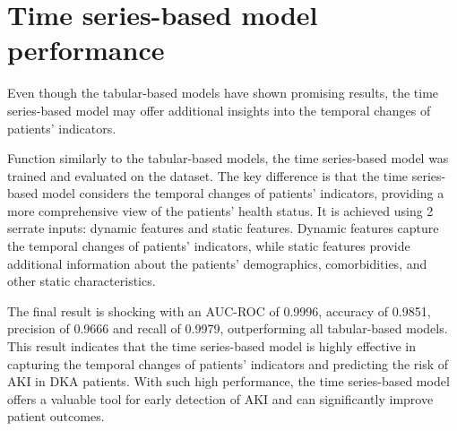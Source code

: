 \documentclass[../main.tex]{subfiles}
\begin{document}
\section{Time series-based model performance}

Even though the tabular-based models have shown promising results, the time series-based model may offer additional insights into the temporal changes of patients' indicators.

Function similarly to the tabular-based models, the time series-based model was trained and evaluated on the dataset.
The key difference is that the time series-based model considers the temporal changes of patients' indicators, providing a more comprehensive view of the patients' health status.
It is achieved using 2 serrate inputs: dynamic features and static features.
Dynamic features capture the temporal changes of patients' indicators, while static features provide additional information about the patients' demographics, comorbidities, and other static characteristics.

The final result is shocking with an AUC-ROC of 0.9996, accuracy of 0.9851, precision of 0.9666 and recall of 0.9979, outperforming all tabular-based models.
This result indicates that the time series-based model is highly effective in capturing the temporal changes of patients' indicators and predicting the risk of AKI in DKA patients.
With such high performance, the time series-based model offers a valuable tool for early detection of AKI and can significantly improve patient outcomes.
\end{document}
